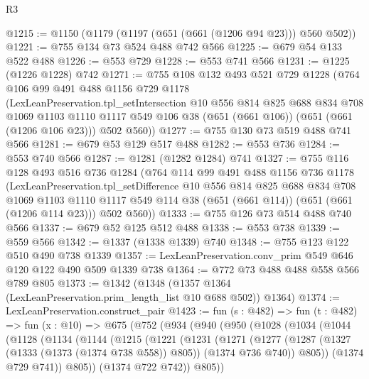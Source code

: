\begin{lexlean}{R3}
\begin{coremodule}
@1215 := @1150 (@1179 (@1197 (@651 (@661 (@1206 @94 @23))) @560 @502))
@1221 := @755 @134 @73 @524 @488 @742 @566
@1225 := @679 @54 @133 @522 @488
@1226 := @553 @729
@1228 := @553 @741 @566
@1231 := @1225 (@1226 @1228) @742
@1271 := @755
    @108
    @132
    @493
    @521
    @729
    @1228
    (@764
      @106
      @99
      @491
      @488
      @1156
      @729
      @1178
      (LexLeanPreservation.tpl_setIntersection
        @10
        @556
        @814
        @825
        @688
        @834
        @708
        @1069
        @1103
        @1110
        @1117
        @549
        @106
        @38
        (@651 (@661 @106))
        (@651 (@661 (@1206 @106 @23)))
        @502
        @560))
@1277 := @755 @130 @73 @519 @488 @741 @566
@1281 := @679 @53 @129 @517 @488
@1282 := @553 @736
@1284 := @553 @740 @566
@1287 := @1281 (@1282 @1284) @741
@1327 := @755
    @116
    @128
    @493
    @516
    @736
    @1284
    (@764
      @114
      @99
      @491
      @488
      @1156
      @736
      @1178
      (LexLeanPreservation.tpl_setDifference
        @10
        @556
        @814
        @825
        @688
        @834
        @708
        @1069
        @1103
        @1110
        @1117
        @549
        @114
        @38
        (@651 (@661 @114))
        (@651 (@661 (@1206 @114 @23)))
        @502
        @560))
@1333 := @755 @126 @73 @514 @488 @740 @566
@1337 := @679 @52 @125 @512 @488
@1338 := @553 @738
@1339 := @559 @566
@1342 := @1337 (@1338 @1339) @740
@1348 := @755 @123 @122 @510 @490 @738 @1339
@1357 := LexLeanPreservation.conv_prim @549 @646 @120 @122 @490 @509 @1339 @738
@1364 := @772 @73 @488 @488 @558 @566 @789 @805
@1373 := @1342 (@1348 (@1357 @1364 (LexLeanPreservation.prim_length_list @10 @688 @502)) @1364)
@1374 := LexLeanPreservation.construct_pair
@1423 := fun (s : @482) =>
  fun (t : @482) =>
  fun (x : @10) =>
  @675
    (@752
      (@934
        (@940
          (@950
            (@1028
              (@1034
                (@1044
                  (@1128
                    (@1134
                      (@1144
                        (@1215
                          (@1221
                            (@1231
                              (@1271
                                (@1277
                                  (@1287
                                    (@1327 (@1333 (@1373 (@1374 @738 @558)) @805))
                                    (@1374 @736 @740))
                                  @805))
                              (@1374 @729 @741))
                            @805))
                        (@1374 @722 @742))
                      @805))

\end{coremodule}
\end{lexlean}

